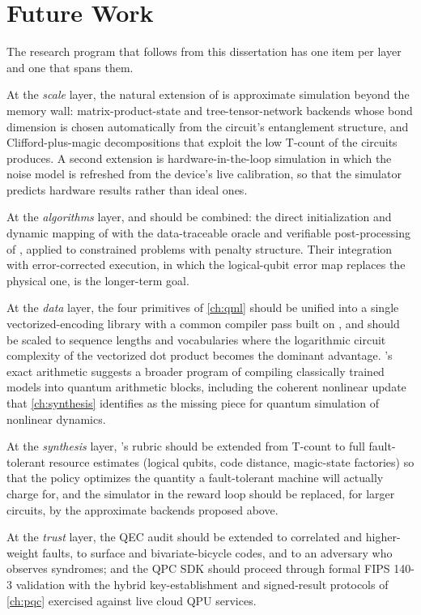 \section{Future Work}\label{sec:conclusion:future}

The research program that follows from this dissertation has one item per layer and one that spans them.

At the \emph{scale} layer, the natural extension of \qgear{} is approximate simulation beyond the memory wall: matrix-product-state and tree-tensor-network backends whose bond dimension is chosen automatically from the circuit's entanglement structure, and Clifford-plus-magic decompositions that exploit the low T-count of the circuits \rubriq{} produces. A second extension is hardware-in-the-loop simulation in which the noise model is refreshed from the device's live calibration, so that the simulator predicts hardware results rather than ideal ones.

At the \emph{algorithms} layer, \deal{} and \qawa{} should be combined: the direct initialization and dynamic mapping of \deal{} with the data-traceable oracle and verifiable post-processing of \qawa{}, applied to constrained problems with penalty structure. Their integration with error-corrected execution, in which the logical-qubit error map replaces the physical one, is the longer-term goal.

At the \emph{data} layer, the four primitives of \cref{ch:qml} should be unified into a single vectorized-encoding library with a common compiler pass built on \shardq{}, and \vqt{} should be scaled to sequence lengths and vocabularies where the logarithmic circuit complexity of the vectorized dot product becomes the dominant advantage. \nnqa's exact arithmetic suggests a broader program of compiling classically trained models into quantum arithmetic blocks, including the coherent nonlinear update that \cref{ch:synthesis} identifies as the missing piece for quantum simulation of nonlinear dynamics.

At the \emph{synthesis} layer, \rubriq's rubric should be extended from T-count to full fault-tolerant resource estimates (logical qubits, code distance, magic-state factories) so that the policy optimizes the quantity a fault-tolerant machine will actually charge for, and the simulator in the reward loop should be replaced, for larger circuits, by the approximate backends proposed above.

At the \emph{trust} layer, the QEC audit should be extended to correlated and higher-weight faults, to surface and bivariate-bicycle codes, and to an adversary who observes syndromes; and the QPC SDK should proceed through formal FIPS 140-3 validation with the hybrid key-establishment and signed-result protocols of \cref{ch:pqc} exercised against live cloud QPU services.

